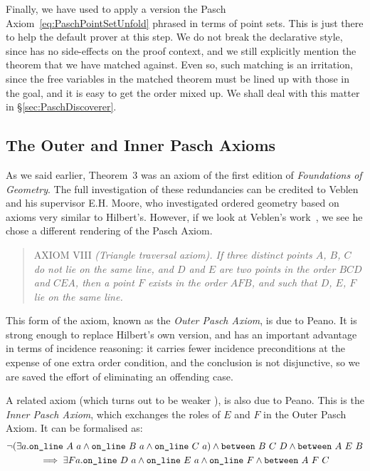 Finally, we have used  to apply a version the Pasch Axiom~\eqref{eq:PaschPointSetUnfold} phrased in terms of point sets. This is just there to help the default prover at this step. We do not break the declarative style, since  has no side-effects on the proof context, and we still explicitly mention the theorem that we have matched against. Even so, such matching is an irritation, since the free variables in the matched theorem must be lined up with those in the goal, and it is easy to get the order mixed up. We shall deal with this matter in \S\ref{sec:PaschDiscoverer}.

\subsection{The Outer and Inner Pasch Axioms}
As we said earlier, Theorem~3 was an axiom of the first edition of \emph{Foundations of Geometry}. The full investigation of these redundancies can be credited to Veblen and his supervisor E.H. Moore, who investigated ordered geometry based on axioms very similar to Hilbert's. However, if we look at Veblen's work~\cite{Veblenphd}, we see he chose a different rendering of the Pasch Axiom.

\begin{quotation}
AXIOM VIII \emph{(Triangle traversal axiom). If three distinct points $A$, $B$, $C$ do not lie on the same line, and $D$ and $E$ are two points in the order $BCD$ and $CEA$, then a point $F$ exists in the order $AFB$, and such that $D$, $E$, $F$ lie on the same line.}
\end{quotation}

This form of the axiom, known as the \emph{Outer Pasch Axiom}, is due to Peano. It is strong enough to replace Hilbert's own version, and has an important advantage in terms of incidence reasoning: it carries fewer incidence preconditions at the expense of one extra order condition, and the conclusion is not disjunctive, so we are saved the effort of eliminating an offending case.

A related axiom (which turns out to be weaker \cite{PaschForms}), is also due to Peano. This is the \emph{Inner Pasch Axiom}, which exchanges the roles of $E$ and $F$ in the Outer Pasch Axiom. It can be formalised as:
\begin{multline}\label{eq:InnerPaschWeak}
  \neg(\exists a.\texttt{on\_line}\ A\ a\wedge \texttt{on\_line}\ B\ a\wedge \texttt{on\_line}\ C\ a) \wedge \texttt{between}\ B\ C\ D \wedge \texttt{between}\ A\ E\ B\\ \implies \exists F a.  \texttt{on\_line}\ D\ a \wedge \texttt{on\_line}\ E\ a \wedge \texttt{on\_line}\ F \wedge \texttt{between}\ A\ F\ C
\end{multline}

